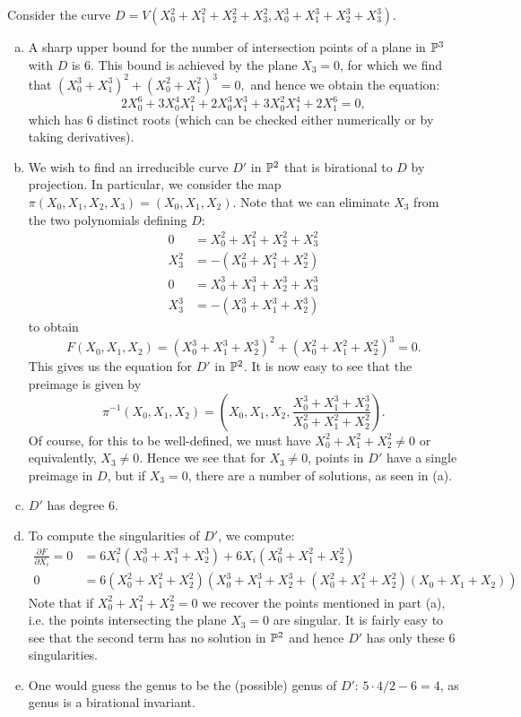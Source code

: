 \documentclass{../../mathnotes}
\begin{document}
Consider the curve $D=V(X_0^2+X_1^2+X_2^2+X_3^2,X_0^3+X_1^3+X_2^3+X_3^3)$.
\begin{enumerate}[(a)]
    \item A sharp upper bound for the number of intersection points of a plane in $\mathbb{P}^3$ with $D$
        is 6. This bound is achieved by the plane $X_3=0$, for which we find that
        $(X_0^3+X_1^3)^2+(X_0^2+X_1^2)^3=0,$ and hence we obtain the equation:
        \[2X_0^6+3X_0^4X_1^2+2X_0^3X_1^3+3X_0^2X_1^4+2X_1^6=0,\]
        which has 6 distinct roots (which can be checked either numerically or by taking derivatives).
    \item We wish to find an irreducible curve $D'$ in $\mathbb{P}^2$ that is birational to $D$ by projection.
        In particular, we consider the map $\pi(X_0,X_1,X_2,X_3)=(X_0,X_1,X_2)$. Note that we can
        eliminate $X_3$ from the two polynomials defining $D$:
        \begin{align*}
            0&=X_0^2+X_1^2+X_2^2+X_3^2\\
            X_3^2&=-(X_0^2+X_1^2+X_2^2)\\
            0&=X_0^3+X_1^3+X_2^3+X_3^3\\
            X_3^3&=-(X_0^3+X_1^3+X_2^3)
        \end{align*}
        to obtain
        \[F(X_0,X_1,X_2)=(X_0^3+X_1^3+X_2^3)^2+(X_0^2+X_1^2+X_2^2)^3=0.\]
        This gives us the equation for $D'$ in $\mathbb{P}^2$. It is now easy to see that the preimage is given by
        \[\pi^{-1}(X_0,X_1,X_2)=\left(X_0,X_1,X_2,\frac{X_0^3+X_1^3+X_2^3}{X_0^2+X_1^2+X_2^2}\right).\]
        Of course, for this to be well-defined, we must have $X_0^2+X_1^2+X_2^2\neq 0$ or equivalently,
        $X_3\neq0$. Hence we see that for $X_3\neq0$, points in $D'$ have a single preimage in $D$, but
        if $X_3=0$, there are a number of solutions, as seen in (a).
    \item $D'$ has degree 6.
    \item To compute the singularities of $D'$, we compute:
        \begin{align*}
            \frac{\partial F}{\partial X_i}=0&=6X_i^2(X_0^3+X_1^3+X_2^3)+6X_i(X_0^2+X_1^2+X_2^2)\\
            0&=6(X_0^2+X_1^2+X_2^2)(X_0^3+X_1^3+X_2^3+(X_0^2+X_1^2+X_2^2)(X_0+X_1+X_2))
        \end{align*}
        Note that if $X_0^2+X_1^2+X_2^2=0$ we recover the points mentioned in part (a), i.e. the points intersecting
        the plane $X_3=0$ are singular. It is fairly easy to see that the second term has no solution in $\mathbb{P}^2$ and
        hence $D'$ has only these 6 singularities.
    \item One would guess the genus to be the (possible) genus of $D'$: $5\cdot 4/2-6=4$, as genus is a birational invariant.
\end{enumerate}
\end{document}
